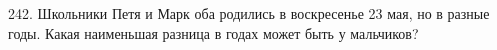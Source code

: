 242. Школьники Петя и Марк оба родились в воскресенье 23 мая, но в разные годы. Какая наименьшая разница в годах может быть у мальчиков?\\
